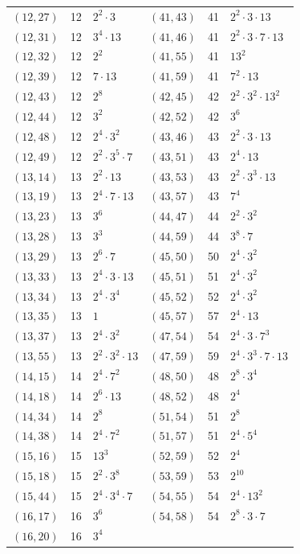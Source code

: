 \documentclass[11pt]{article}
\begin{document}
\begin{longtable}{@{}lrl@{\qquad}lrl@{}}
$(12,27)$ & 12 & $2^{2}\cdot 3$ & $(41,43)$ & 41 & $2^{2}\cdot 3\cdot 13$\\
$(12,31)$ & 12 & $3^{4}\cdot 13$ & $(41,46)$ & 41 & $2^{2}\cdot 3\cdot 7\cdot 13$\\
$(12,32)$ & 12 & $2^{2}$ & $(41,55)$ & 41 & $13^{2}$\\
$(12,39)$ & 12 & $7\cdot 13$ & $(41,59)$ & 41 & $7^{2}\cdot 13$\\
$(12,43)$ & 12 & $2^{8}$ & $(42,45)$ & 42 & $2^{2}\cdot 3^{2}\cdot 13^{2}$\\
$(12,44)$ & 12 & $3^{2}$ & $(42,52)$ & 42 & $3^{6}$\\
$(12,48)$ & 12 & $2^{4}\cdot 3^{2}$ & $(43,46)$ & 43 & $2^{2}\cdot 3\cdot 13$\\
$(12,49)$ & 12 & $2^{2}\cdot 3^{5}\cdot 7$ & $(43,51)$ & 43 & $2^{4}\cdot 13$\\
$(13,14)$ & 13 & $2^{2}\cdot 13$ & $(43,53)$ & 43 & $2^{2}\cdot 3^{3}\cdot 13$\\
$(13,19)$ & 13 & $2^{4}\cdot 7\cdot 13$ & $(43,57)$ & 43 & $7^{4}$\\
$(13,23)$ & 13 & $3^{6}$ & $(44,47)$ & 44 & $2^{2}\cdot 3^{2}$\\
$(13,28)$ & 13 & $3^{3}$ & $(44,59)$ & 44 & $3^{8}\cdot 7$\\
$(13,29)$ & 13 & $2^{6}\cdot 7$ & $(45,50)$ & 50 & $2^{4}\cdot 3^{2}$\\
$(13,33)$ & 13 & $2^{4}\cdot 3\cdot 13$ & $(45,51)$ & 51 & $2^{4}\cdot 3^{2}$\\
$(13,34)$ & 13 & $2^{4}\cdot 3^{4}$ & $(45,52)$ & 52 & $2^{4}\cdot 3^{2}$\\
$(13,35)$ & 13 & $1$ & $(45,57)$ & 57 & $2^{4}\cdot 13$\\
$(13,37)$ & 13 & $2^{4}\cdot 3^{2}$ & $(47,54)$ & 54 & $2^{4}\cdot 3\cdot 7^{3}$\\
$(13,55)$ & 13 & $2^{2}\cdot 3^{2}\cdot 13$ & $(47,59)$ & 59 & $2^{4}\cdot 3^{3}\cdot 7\cdot 13$\\
$(14,15)$ & 14 & $2^{4}\cdot 7^{2}$ & $(48,50)$ & 48 & $2^{8}\cdot 3^{4}$\\
$(14,18)$ & 14 & $2^{6}\cdot 13$ & $(48,52)$ & 48 & $2^{4}$\\
$(14,34)$ & 14 & $2^{8}$ & $(51,54)$ & 51 & $2^{8}$\\
$(14,38)$ & 14 & $2^{4}\cdot 7^{2}$ & $(51,57)$ & 51 & $2^{4}\cdot 5^{4}$\\
$(15,16)$ & 15 & $13^{3}$ & $(52,59)$ & 52 & $2^{4}$\\
$(15,18)$ & 15 & $2^{2}\cdot 3^{8}$ & $(53,59)$ & 53 & $2^{10}$\\
$(15,44)$ & 15 & $2^{4}\cdot 3^{4}\cdot 7$ & $(54,55)$ & 54 & $2^{4}\cdot 13^{2}$\\
$(16,17)$ & 16 & $3^{6}$ & $(54,58)$ & 54 & $2^{8}\cdot 3\cdot 7$\\
$(16,20)$ & 16 & $3^{4}$ & & &\\
\end{longtable}
\endgroup
\end{document}
